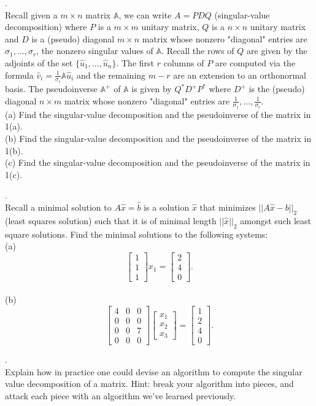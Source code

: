 \documentclass[12 pt]{article}
\begin{document}
. \\Recall given a $m \times n$ matrix $\mathbb{A}$, we can write $A=PDQ$ (singular-value decomposition) where $P$ is a $m \times m$ unitary matrix, $Q$ is a $n \times n$ unitary matrix and $D$ is a (pseudo) diagonal $m \times n$ matrix whose nonzero "diagonal" entries are $\sigma_1, \dots, \sigma_r$, the nonzero singular values of $\mathbb{A}$. Recall the rows of $Q$ are given by the adjoints of the set $\{ \hat{u}_1, \dots, \hat{u}_n \}$. The first $r$ columns of $P$ are computed 
via the formula $\hat{v}_i = \frac{1}{\sigma_i} \mathbb{A} \hat{u}_i$ and the remaining $m-r$ are an extension to an orthonormal basis. The pseudoinverse 
$\mathbb{A}^+$ of $\mathbb{A}$ is given by $Q^*D^+P^*$ where $D^+$ is the (pseudo) diagonal $n \times m$ matrix whose nonzero 
"diagonal" entries are $\frac{1}{\sigma_1}, \dots, \frac{1}{\sigma_r}$. \\
(a) Find the singular-value decomposition and the pseudoinverse of the matrix in 1(a). \\
(b) Find the singular-value decomposition and the pseudoinverse of the matrix in 1(b). \\
(c) Find the singular-value decomposition and the pseudoinverse of the matrix in 1(c). \\

\medskip

. \\
Recall a minimal solution to $A\hat{x}=\hat{b}$ is  a solution $\hat{x}$ that minimizes $||A\hat{x}-b||_2$ (least squares solution) such that it is of minimal length $||\hat{x}||_2$ amongst such least square solutions. Find the minimal solutions to the following systems: \\
(a) 
$$\begin{bmatrix} 1 \\ 1 \\1 \end{bmatrix} x_1 = \begin{bmatrix} 2 \\ 4 \\ 0 \end{bmatrix}.$$ \\
(b) 
$$\begin{bmatrix} 4 & 0 & 0 \\ 0 & 0 & 0 \\ 0 & 0 & 7 \\ 0 & 0 & 0 \end{bmatrix} \begin{bmatrix} x_1 \\ x_2 \\ x_3 \end{bmatrix} 
= \begin{bmatrix} 1 \\ 2 \\ 4 \\ 0 \end{bmatrix}.$$

. \\
Explain how in practice one could devise an algorithm to compute the singular
value decomposition of a matrix. Hint: break your algorithm into pieces, and attack
each piece with an algorithm we've learned previously. 
\end{document}

